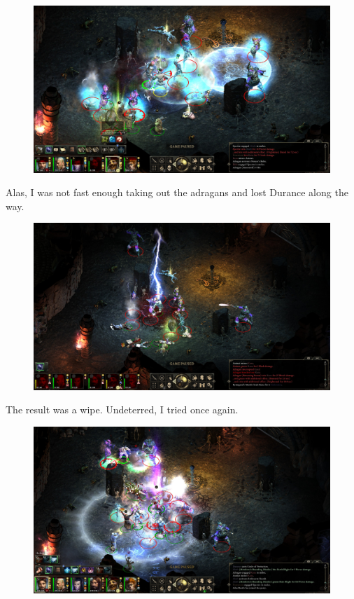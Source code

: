\documentclass{article}
\begin{document}
\begin{figure}
\includegraphics[scale=0.33]{files/blog/2018_11_25_pillars_of_eternity_path_of_the_damned_act_ii/2018_11_25_adragan2.jpg}
\end{figure}

Alas, I was not fast enough taking out the adragans and lost Durance along the way.

\begin{figure}
\includegraphics[scale=0.33]{files/blog/2018_11_25_pillars_of_eternity_path_of_the_damned_act_ii/2018_11_25_adragan3.jpg}
\end{figure}

The result was a wipe.  Undeterred, I tried once again.

\begin{figure}
\includegraphics[scale=0.33]{files/blog/2018_11_25_pillars_of_eternity_path_of_the_damned_act_ii/2018_11_25_adragan4.jpg}
\end{figure}
\end{document}
